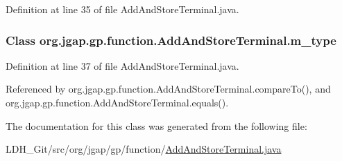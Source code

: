 Definition at line 35 of file Add\-And\-Store\-Terminal.\-java.

\hypertarget{classorg_1_1jgap_1_1gp_1_1function_1_1_add_and_store_terminal_a4cdce43124d31812835c2e936c5f2811}{
\subsubsection[{m\-\_\-type}]{\setlength{\rightskip}{0pt plus 5cm}Class org.\-jgap.\-gp.\-function.\-Add\-And\-Store\-Terminal.\-m\-\_\-type\hspace{0.3cm}{\ttfamily [private]}}}\label{classorg_1_1jgap_1_1gp_1_1function_1_1_add_and_store_terminal_a4cdce43124d31812835c2e936c5f2811}


Definition at line 37 of file Add\-And\-Store\-Terminal.\-java.



Referenced by org.\-jgap.\-gp.\-function.\-Add\-And\-Store\-Terminal.\-compare\-To(), and org.\-jgap.\-gp.\-function.\-Add\-And\-Store\-Terminal.\-equals().



The documentation for this class was generated from the following file\-:\begin{DoxyCompactItemize}
\item 
L\-D\-H\-\_\-\-Git/src/org/jgap/gp/function/\hyperlink{_add_and_store_terminal_8java}{Add\-And\-Store\-Terminal.\-java}\end{DoxyCompactItemize}
